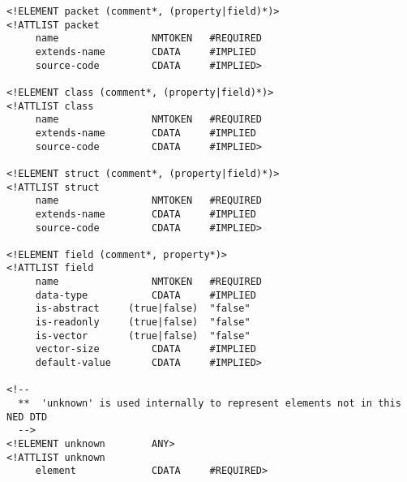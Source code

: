 \begin{verbatim}
<!ELEMENT packet (comment*, (property|field)*)>
<!ATTLIST packet
     name                NMTOKEN   #REQUIRED
     extends-name        CDATA     #IMPLIED
     source-code         CDATA     #IMPLIED>

<!ELEMENT class (comment*, (property|field)*)>
<!ATTLIST class
     name                NMTOKEN   #REQUIRED
     extends-name        CDATA     #IMPLIED
     source-code         CDATA     #IMPLIED>

<!ELEMENT struct (comment*, (property|field)*)>
<!ATTLIST struct
     name                NMTOKEN   #REQUIRED
     extends-name        CDATA     #IMPLIED
     source-code         CDATA     #IMPLIED>

<!ELEMENT field (comment*, property*)>
<!ATTLIST field
     name                NMTOKEN   #REQUIRED
     data-type           CDATA     #IMPLIED
     is-abstract     (true|false)  "false"
     is-readonly     (true|false)  "false"
     is-vector       (true|false)  "false"
     vector-size         CDATA     #IMPLIED
     default-value       CDATA     #IMPLIED>

<!--
  **  'unknown' is used internally to represent elements not in this NED DTD
  -->
<!ELEMENT unknown        ANY>
<!ATTLIST unknown
     element             CDATA     #REQUIRED>
\end{verbatim}


